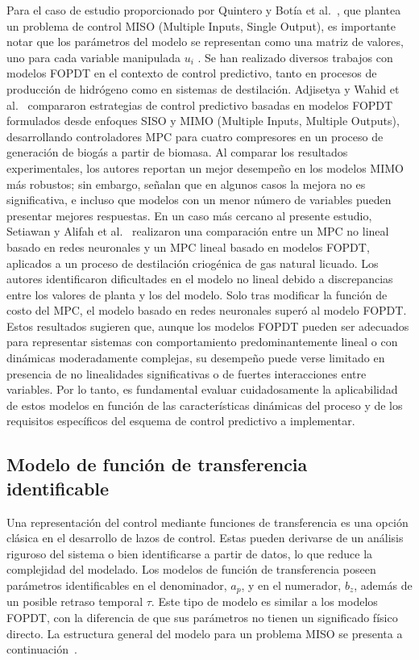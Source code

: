 Para el caso de estudio proporcionado por Quintero y Botía et al.~\cite{ref10}, que plantea un problema de control MISO (Multiple Inputs, Single Output), es importante notar que los parámetros del modelo se representan como una matriz de valores, uno para cada variable manipulada $u_i$ \cite{ref17}. Se han realizado diversos trabajos con modelos FOPDT en el contexto de control predictivo, tanto en procesos de producción de hidrógeno como en sistemas de destilación. Adjisetya y Wahid et al.~\cite{ref18} compararon estrategias de control predictivo basadas en modelos FOPDT formulados desde enfoques SISO y MIMO (Multiple Inputs, Multiple Outputs), desarrollando controladores MPC para cuatro compresores en un proceso de generación de biogás a partir de biomasa. Al comparar los resultados experimentales, los autores reportan un mejor desempeño en los modelos MIMO más robustos; sin embargo, señalan que en algunos casos la mejora no es significativa, e incluso que modelos con un menor número de variables pueden presentar mejores respuestas. En un caso más cercano al presente estudio, Setiawan y Alifah et al.~\cite{ref19} realizaron una comparación entre un MPC no lineal basado en redes neuronales y un MPC lineal basado en modelos FOPDT, aplicados a un proceso de destilación criogénica de gas natural licuado. Los autores identificaron dificultades en el modelo no lineal debido a discrepancias entre los valores de planta y los del modelo. Solo tras modificar la función de costo del MPC, el modelo basado en redes neuronales superó al modelo FOPDT. Estos resultados sugieren que, aunque los modelos FOPDT pueden ser adecuados para representar sistemas con comportamiento predominantemente lineal o con dinámicas moderadamente complejas, su desempeño puede verse limitado en presencia de no linealidades significativas o de fuertes interacciones entre variables. Por lo tanto, es fundamental evaluar cuidadosamente la aplicabilidad de estos modelos en función de las características dinámicas del proceso y de los requisitos específicos del esquema de control predictivo a implementar.

\subsection{Modelo de función de transferencia identificable}

Una representación del control mediante funciones de transferencia es una opción clásica en el desarrollo de lazos de control. Estas pueden derivarse de un análisis riguroso del sistema o bien identificarse a partir de datos, lo que reduce la complejidad del modelado. Los modelos de función de transferencia poseen parámetros identificables en el denominador, $a_p$, y en el numerador, $b_z$, además de un posible retraso temporal $\tau$. Este tipo de modelo es similar a los modelos FOPDT, con la diferencia de que sus parámetros no tienen un significado físico directo. La estructura general del modelo para un problema MISO se presenta a continuación~\cite{ref20}.

